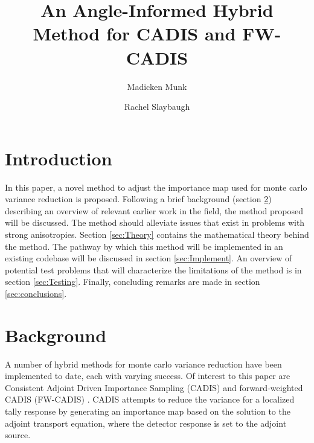 \documentclass{mc2015}
\begin{document}
\title{An Angle-Informed Hybrid Method for CADIS and FW-CADIS}

\author{Madicken Munk}
\author{Rachel Slaybaugh}

\maketitle

\section{Introduction}

In this paper, a novel method to adjust the importance map used for monte carlo variance reduction is proposed. Following a brief background (section \ref{sec:Background}) describing an overview of relevant earlier work in the field, the method proposed will be discussed. The method should alleviate issues that exist in problems with strong anisotropies. 
Section \ref{sec:Theory} contains the mathematical theory behind the method. 
The pathway by which this method will be implemented in an existing codebase will be discussed in section \ref{sec:Implement}. 
An overview of potential test problems that will characterize the limitations of the method is in section \ref{sec:Testing}. 
Finally, concluding remarks are made in section \ref{sec:conclusions}. 

\section{Background}
\label{sec:Background}

A number of hybrid methods for monte carlo variance reduction have been implemented to date, each with varying success. Of interest to this paper are Consistent Adjoint Driven Importance Sampling (CADIS) \cite{wagner_automatic_1997,wagner_automated_1998,haghighat_monte_2003} and forward-weighted CADIS (FW-CADIS) \cite{wagner_forward-weighted_2007,wagner_forward-weighted_2009,wagner_forward-weighted_2010}. CADIS attempts to reduce the variance for a localized tally response by generating an importance map based on the solution to the adjoint transport equation, where the detector response is set to the adjoint source. 
\end{document}
